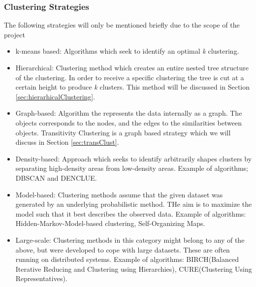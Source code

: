 \documentclass[a4paper,10pt]{article}
\theoremstyle{plain}
\theoremstyle{definition}
\begin{document}
\subsubsection{Clustering Strategies}
The following strategies will only be mentioned briefly due to the scope of the project
\begin{itemize}
	\item k-means based: Algorithms which seek to identify an optimal \textit{k} clustering.
	\item Hierarchical: Clustering method which creates an entire nested tree structure of the clustering. In order to receive a specific clustering the tree is cut at a certain height to produce \textit{k} clusters. This method will be discussed in Section \ref{sec:hierarhicalClustering}.
	\item Graph-based: Algorithm the represents the data internally as a graph. The objects corresponds to the nodes, and the edges to the similarities between objects. Transitivity Clustering is a graph based strategy which we will discuss in Section \ref{sec:transClust}.
	\item Density-based: Approach which seeks to identify arbitrarily shapes clusters by separating high-density areas from low-density areas. Example of algorithms; DBSCAN and DENCLUE.
	\item Model-based: Clustering methods assume that the given dataset was generated by an underlying probabilistic method. THe aim is to maximize the model such that it best describes the observed data. Example of algorithms: Hidden-Markov-Model-based clustering, Self-Organizing Maps.
	\item Large-scale: Clustering methods in this category might belong to any of the above, but were developed to cope with large datasets. These are often running on distributed systems. Example of algorithms: BIRCH(Balanced Iterative Reducing and Clustering using Hierarchies), CURE(Clustering Using Representatives).
\end{itemize}

\end{document}
